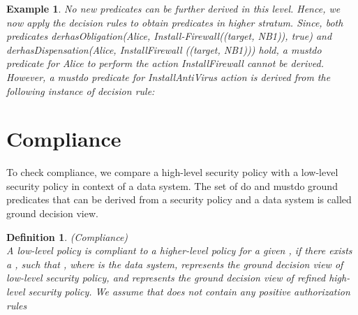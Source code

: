 \documentclass[12pt,journal,letterpaper,onecolumn]{IEEEtran}
\newtheorem{definition}{Definition}[section]
\newtheorem{example}{Example}[section]
\begin{document}
\begin{example}

No new predicates can be further derived in this level. Hence, we
now apply the decision rules to obtain predicates in higher stratum.
Since, both predicates
{\ttfamily derhasObligation(Alice,
Install}-{\ttfamily Firewall((target, NB1)), true)} and {\ttfamily
derhasDispensation(Alice, InstallFirewall} {\ttfamily ((target, NB1)))} hold, a
{\ttfamily mustdo} predicate for Alice to perform the action
{\ttfamily InstallFirewall} cannot be derived. However,  a
{\ttfamily mustdo} predicate for {\ttfamily InstallAntiVirus} action
is derived from the following instance of decision rule:

\noindent {}
\end{example}


\section{Compliance}
\label{sec:checking}

To check compliance, we compare a high-level security policy
with a low-level security policy in context of a data system.
The set of {\ttfamily do} and {\ttfamily mustdo} ground predicates
that can be derived from a security policy and a data system is
called ground decision view.

\begin{definition}(Compliance)\\
A low-level policy  is {\em compliant} to a higher-level policy
 for a given ,  if there exists a , such
that  , where  is the data
system,  represents the ground decision view of low-level
security policy, and  represents the ground decision
view of refined high-level security policy. We assume that  does
not contain any positive authorization rules \label{def:compliance}
\end{definition}
\end{document}
